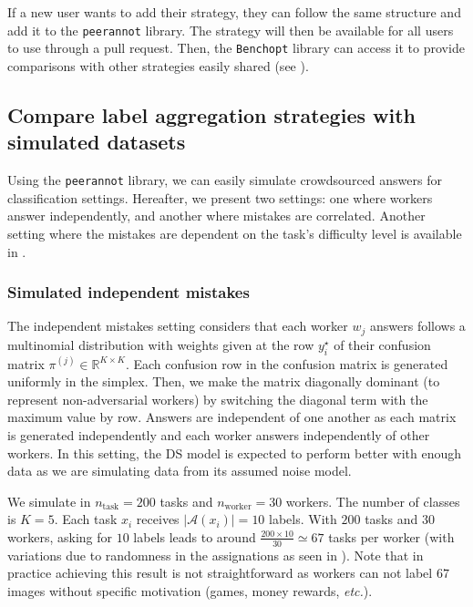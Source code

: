 If a new user wants to add their strategy, they can follow the same structure and add it to the \texttt{peerannot} library. The strategy will then be available for all users to use through a pull request.
Then, the \texttt{Benchopt} library can access it to provide comparisons with other strategies easily shared (see ).

\subsection{Compare label aggregation strategies with simulated datasets}
\label{subsec:simulated}

Using the \texttt{peerannot} library, we can easily simulate crowdsourced answers for classification settings.
Hereafter, we present two settings: one where workers answer independently, and another where mistakes are correlated.
Another setting where the mistakes are dependent on the task's difficulty level is available in .

\subsubsection{Simulated independent mistakes}

The independent mistakes setting considers that each worker $w_j$ answers follows a multinomial distribution with weights given at the row $y_i^\star$ of their confusion matrix $\pi^{(j)}\in\mathbb{R}^{K\times K}$. Each confusion row in the confusion matrix is generated uniformly in the simplex. Then, we make the matrix diagonally dominant (to represent non-adversarial workers) by switching the diagonal term with the maximum value by row. Answers are independent of one another as each matrix is generated independently and each worker answers independently of other workers. In this setting, the DS model is expected to perform better with enough data as we are simulating data from its assumed noise model.

We simulate in  $n_{\text{task}}=200$ tasks and $n_{\text{worker}}=30$ workers. The number of classes is $K=5$.
Each task $x_i$ receives $|\mathcal{A}(x_i)|=10$ labels. With $200$ tasks and $30$ workers, asking for $10$ labels leads to around $\frac{200\times 10}{30}\simeq 67$ tasks per worker (with variations due to randomness in the assignations as seen in ). Note that in practice achieving this result is not straightforward as workers can not label $67$ images without specific motivation (games, money rewards, \textit{etc.}).

